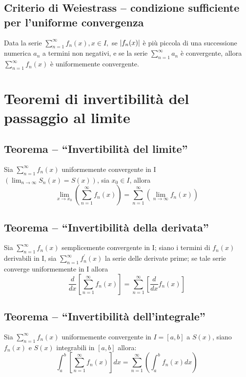 \subsection{Criterio di Weiestrass -- condizione sufficiente per l'uniforme convergenza\label{Weiestrass}}
\begin{defi}
  Data la serie $\displaystyle\sum_{n=1}^{\infty}f_n(x), x\in I,$ se $\lvert f_n(x)\rvert$ è più piccola
  di una successione numerica $a_n$ a termini non negativi, e se la serie
  $\displaystyle\sum_{n=1}^\infty a_n$ è convergente, allora
  $\displaystyle\sum_{n=1}^\infty f_n(x)$ è uniformemente convergente.
\end{defi}
\clearpage
\section{Teoremi di invertibilità del passaggio al limite}
\subsection{Teorema -- ``Invertibilità del limite''}
\begin{teorema}
  Sia $\displaystyle\sum_{n=1}^\infty f_n(x)$ uniformemente convergente in I
  $(\lim_{n\to\infty}S_n(x)=S(x))$, sia $x_0\in I$, allora
  \begin{equation*}
    \lim_{x\to x_0}\left(\displaystyle\sum_{n=1}^\infty f_n(x)\right)=
    \displaystyle\sum_{n=1}^\infty\left(\lim_{n\to\infty}f_n(x)\right)
  \end{equation*}
\end{teorema}
\subsection{Teorema -- ``Invertibilità della derivata''}
\begin{teorema}
  Sia $\displaystyle\sum_{n=1}^\infty f_n(x)$ semplicemente convergente in I; siano i
  termini di $f_n(x)$ derivabili in I, sia $\displaystyle\sum_{n=1}^\infty f_n^\prime(x)$
  la serie delle derivate prime; se tale serie converge uniformemente in I allora
  \begin{equation*}
    \frac{d}{dx}\left[\displaystyle\sum_{n=1}^\infty f_n(x)\right]=
    \displaystyle\sum_{n=1}^\infty\left[\frac{d}{dx}f_n(x)\right]
  \end{equation*}
\end{teorema}
\subsection{Teorema -- ``Invertibilità dell'integrale''}
\begin{teorema}
  Sia $\displaystyle\sum_{n=1}^\infty f_n(x)$ uniformemente convergente in $I=[a,b]$ a $S(x)$, siano $f_n(x)$ e $S(x)$ integrabili in $[a,b]$ allora:
  \begin{equation*}
    \int_a^b\left[\displaystyle\sum_{n=1}^\infty f_n(x)\right]dx=
    \displaystyle\sum_{n=1}^\infty\left(\int_a^bf_n(x)dx\right)
  \end{equation*}
\end{teorema}
